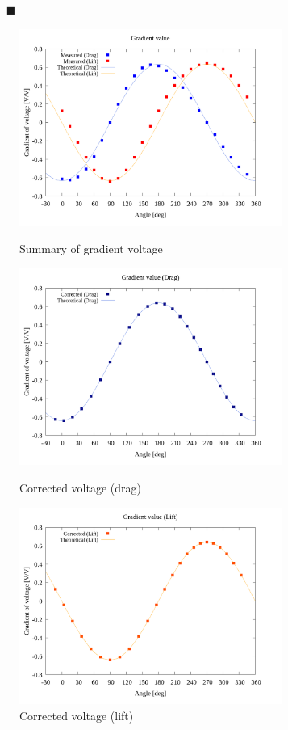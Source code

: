 \documentclass[twocolumn,a4j]{jsarticle}
\begin{document}
\begin{itemize}
    \item [$\blacksquare$] 
\end{itemize}

\begin{figure}[htbp]
    \footnotesize
    \begin{center}
        \includegraphics[width=86mm]{../graphes/offset_x=5_y=0/20/20_adjust-value.png}
        \caption{Summary of gradient voltage}
        \includegraphics[width=86mm]{../graphes/offset_x=5_y=0/21/21-2_corrected_offset_drag.png}
        \caption{Corrected voltage (drag)}
        \includegraphics[width=86mm]{../graphes/offset_x=5_y=0/21/21-2_corrected_offset_lift.png}
        \caption{Corrected voltage (lift)}
    \end{center}
\end{figure}
\end{document}
